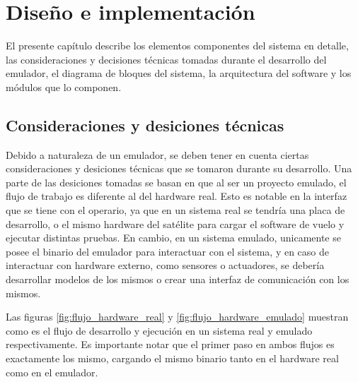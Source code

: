 \chapter{Diseño e implementación} %
\label{Chapter3}

El presente capítulo describe los elementos componentes del sistema en detalle, las consideraciones y decisiones técnicas tomadas durante el desarrollo del emulador, el diagrama de bloques del sistema, la arquitectura del software y los módulos que lo componen.



\section{Consideraciones y desiciones técnicas}
\label{sec:consideraciones_decisiones_tecnicas}


Debido a naturaleza de un emulador, se deben tener en cuenta ciertas consideraciones y desiciones técnicas que se tomaron durante su desarrollo. Una parte de las desiciones tomadas se basan en que al ser un proyecto emulado, el flujo de trabajo es diferente al del hardware real. Esto es notable en la interfaz que se tiene con el operario, ya que en un sistema real se tendría una placa de desarrollo, o el mismo hardware del satélite para cargar el software de vuelo y ejecutar distintas pruebas. En cambio, en un sistema emulado, unicamente se posee el binario del emulador para interactuar con el sistema, y en caso de interactuar con hardware externo, como sensores o actuadores, se debería desarrollar modelos de los mismos o crear una interfaz de comunicación con los mismos.

Las figuras \ref{fig:flujo_hardware_real} y \ref{fig:flujo_hardware_emulado} muestran como es el flujo de desarrollo y ejecución en un sistema real y emulado respectivamente. Es importante notar que el primer paso en ambos flujos es exactamente los mismo, cargando el mismo binario tanto en el hardware real como en el emulador.


